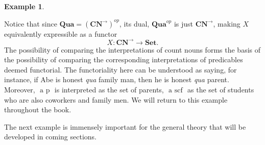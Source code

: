 \documentclass[a4paper]{book}
\theoremstyle{definition}
\newtheorem{example}{Example}[section]
\theoremstyle{definition}
\theoremstyle{definition}
\theoremstyle{theorem}
\theoremstyle{definition}
\begin{document}
\begin{example}
\begin{enumerate}
		\end{enumerate} \noindent 
	Notice that since $\textbf{Qua} = (\textbf{CN}^{\rightarrow})^{op}$, its dual, $\textbf{Qua}^{op}$ is just $\textbf{CN}^{\rightarrow}$, making $X$ equivalently expressible as a functor 
	\begin{equation}
	X: \textbf{CN}^{\rightarrow} \rightarrow \textbf{Set}. 
	\end{equation}
	The possibility of comparing the interpretations of count nouns forms the basis of the possibility of comparing the corresponding interpretations of predicables deemed functorial. The functoriality here can be understood as saying, for instance, if Abe is honest \textit{qua} family man, then he is honest \textit{qua} parent. Moreover, $\boxed{\text{ a p }}$ is interpreted as the set of parents, $\boxed{\text{ a scf }}$ as the set of students who are also coworkers and family men. We will return to this example throughout the book. 
\end{example}
The next example is immensely important for the general theory that will be developed in coming sections. 
\end{document}
